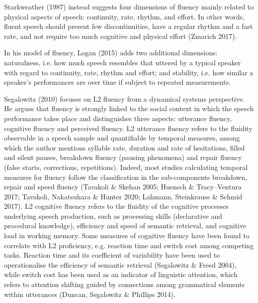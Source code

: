 \begin{styleStandard}
Starkweather (1987) instead suggests four dimensions of fluency mainly related to physical aspects of speech: continuity, rate, rhythm, and effort. In other words, fluent speech should present few discontinuities, have a regular rhythm and a fast rate, and not require too much cognitive and physical effort (Zmarich 2017).
\end{styleStandard}

\begin{styleStandard}
In his model of fluency, Logan (2015) adds two additional dimensions: naturalness, i.e. how much speech resembles that uttered by a typical speaker with regard to continuity, rate, rhythm and effort; and stability, i.e. how similar a speaker’s performances are over time if subject to repeated measurements.
\end{styleStandard}

\begin{styleStandard}
Segalowitz (2010) focuses on L2 fluency from a dynamical systems perspective. He argues that fluency is strongly linked to the social context in which the speech performance takes place and distinguishes three aspects: utterance fluency, cognitive fluency and perceived fluency. L2 utterance fluency refers to the fluidity observable in a speech sample and quantifiable by temporal measures, among which the author mentions syllable rate, duration and rate of hesitations, filled and silent pauses, breakdown fluency (pausing phenomena) and repair fluency (false starts, corrections, repetitions). Indeed, most studies calculating temporal measures for fluency follow the classification in the sub-components breakdown, repair and speed fluency (Tavakoli \& Skehan 2005; Huensch \& Tracy–Ventura 2017; Tavakoli, Nakatsuhara \& Hunter 2020; Lahmann, Steinkrauss \& Schmid 2017). L2 cognitive fluency refers to the fluidity of the cognitive processes underlying speech production, such as processing skills (declarative and procedural knowledge), efficiency and speed of semantic retrieval, and cognitive load in working memory. Some measures of cognitive fluency have been found to correlate with L2 proficiency, e.g. reaction time and switch cost among competing tasks. Reaction time and its coefficient of variability have been used to operationalise the efficiency of semantic retrieval (Segalowitz \& Freed 2004), while switch cost has been used as an indicator of linguistic attention, which refers to attention shifting guided by connections among grammatical elements within utterances (Duncan, Segalowitz \& Phillips 2014).
\end{styleStandard}

